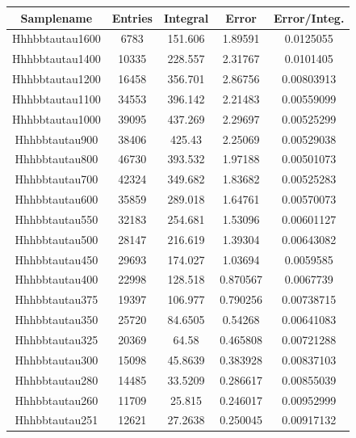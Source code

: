\begin{table}[]
  \centering
  \scriptsize
\begin{tabular}{|c|c|c|c|c|}
\hline
Samplename      & Entries       & Integral      & Error         & Error/Integ. \\
\hline
Hhhbbtautau1600 & 6783          & 151.606       & 1.89591       & 0.0125055 \\
Hhhbbtautau1400 & 10335         & 228.557       & 2.31767       & 0.0101405 \\
Hhhbbtautau1200 & 16458         & 356.701       & 2.86756       & 0.00803913 \\
Hhhbbtautau1100 & 34553         & 396.142       & 2.21483       & 0.00559099 \\
Hhhbbtautau1000 & 39095         & 437.269       & 2.29697       & 0.00525299 \\
Hhhbbtautau900  & 38406         & 425.43        & 2.25069       & 0.00529038 \\
Hhhbbtautau800  & 46730         & 393.532       & 1.97188       & 0.00501073 \\
Hhhbbtautau700  & 42324         & 349.682       & 1.83682       & 0.00525283 \\
Hhhbbtautau600  & 35859         & 289.018       & 1.64761       & 0.00570073 \\
Hhhbbtautau550  & 32183         & 254.681       & 1.53096       & 0.00601127 \\
Hhhbbtautau500  & 28147         & 216.619       & 1.39304       & 0.00643082 \\
Hhhbbtautau450  & 29693         & 174.027       & 1.03694       & 0.0059585 \\
Hhhbbtautau400  & 22998         & 128.518       & 0.870567      & 0.0067739 \\
Hhhbbtautau375  & 19397         & 106.977       & 0.790256      & 0.00738715 \\
Hhhbbtautau350  & 25720         & 84.6505       & 0.54268       & 0.00641083 \\
Hhhbbtautau325  & 20369         & 64.58         & 0.465808      & 0.00721288 \\
Hhhbbtautau300  & 15098         & 45.8639       & 0.383928      & 0.00837103 \\
Hhhbbtautau280  & 14485         & 33.5209       & 0.286617      & 0.00855039 \\
Hhhbbtautau260  & 11709         & 25.815        & 0.246017      & 0.00952999 \\
Hhhbbtautau251  & 12621         & 27.2638       & 0.250045      & 0.00917132 \\

\end{tabular}
\end{table}
